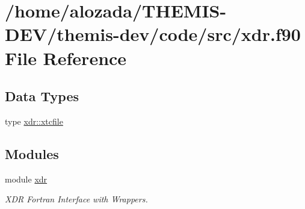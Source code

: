 \hypertarget{xdr_8f90}{}\section{/home/alozada/\+T\+H\+E\+M\+I\+S-\/\+D\+E\+V/themis-\/dev/code/src/xdr.f90 File Reference}
\label{xdr_8f90}
\subsection*{Data Types}
\begin{DoxyCompactItemize}
\item 
type \hyperlink{structxdr_1_1xtcfile}{xdr\+::xtcfile}
\end{DoxyCompactItemize}
\subsection*{Modules}
\begin{DoxyCompactItemize}
\item 
module \hyperlink{namespacexdr}{xdr}
\begin{DoxyCompactList}\small\item\em X\+DR Fortran Interface with Wrappers. \end{DoxyCompactList}\end{DoxyCompactItemize}
